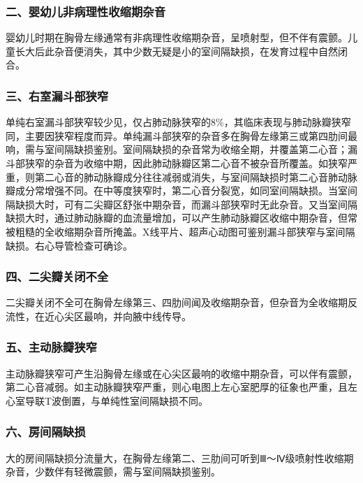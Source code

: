 \subsubsection{二、婴幼儿非病理性收缩期杂音}

婴幼儿时期在胸骨左缘通常有非病理性收缩期杂音，呈喷射型，但不伴有震颤。儿童长大后此杂音便消失，其中少数无疑是小的室间隔缺损，在发育过程中自然闭合。

\subsubsection{三、右室漏斗部狭窄}

单纯右室漏斗部狭窄较少见，仅占肺动脉狭窄的8\%，其临床表现与肺动脉瓣狭窄同，主要因狭窄程度而异。单纯漏斗部狭窄的杂音多在胸骨左缘第三或第四肋间最响，需与室间隔缺损鉴别。室间隔缺损的杂音常为收缩全期，并覆盖第二心音；漏斗部狭窄的杂音为收缩中期，因此肺动脉瓣区第二心音不被杂音所覆盖。如狭窄严重，则第二心音的肺动脉瓣成分往往减弱或消失，与室间隔缺损时第二心音肺动脉瓣成分常增强不同。在中等度狭窄时，第二心音分裂宽，如同室间隔缺损。当室间隔缺损大时，可有二尖瓣区舒张中期杂音，而漏斗部狭窄时无此杂音。又当室间隔缺损大时，通过肺动脉瓣的血流量增加，可以产生肺动脉瓣区收缩中期杂音，但常被粗糙的全收缩期杂音所掩盖。X线平片、超声心动图可鉴别漏斗部狭窄与室间隔缺损。右心导管检查可确诊。

\subsubsection{四、二尖瓣关闭不全}

二尖瓣关闭不全可在胸骨左缘第三、四肋间闻及收缩期杂音，但杂音为全收缩期反流性，在近心尖区最响，并向腋中线传导。

\subsubsection{五、主动脉瓣狭窄}

主动脉瓣狭窄可产生沿胸骨左缘或在心尖区最响的收缩中期杂音，可以伴有震颤，第二心音减弱。如主动脉瓣狭窄严重，则心电图上左心室肥厚的征象也严重，且左心室导联T波倒置，与单纯性室间隔缺损不同。

\subsubsection{六、房间隔缺损}

大的房间隔缺损分流量大，在胸骨左缘第二、三肋间可听到Ⅲ～Ⅳ级喷射性收缩期杂音，少数伴有轻微震颤，需与室间隔缺损鉴别。

